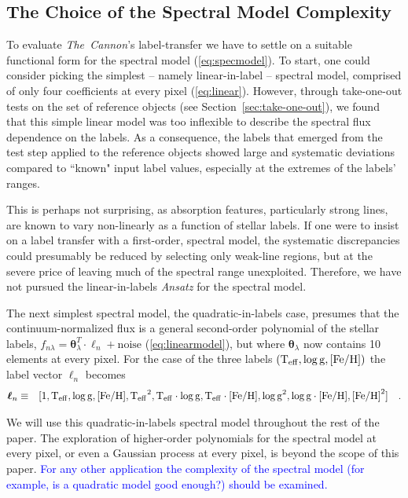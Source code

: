 \documentclass[12pt, preprint]{aastex}
\newcommand{\sectionname}{Section}
\newcommand{\tc}{\textsl{The~Cannon}}
\newcommand{\set}[1]{\bm{#1}}
\newcommand{\starlabel}{\ell}
\newcommand{\starlabelvec}{\set{\starlabel}}
\newcommand{\teff}{\mbox{$\rm T_{eff}$}}
\newcommand{\feh}{\mbox{$\rm [Fe/H]$}}
\newcommand{\logg}{\mbox{$\rm \log g$}}
\begin{document}
\subsection{The Choice of the Spectral Model Complexity}
\label{sec:ModelComplexity} 

To evaluate \tc 's label-transfer we have to settle on a suitable functional form for the spectral model (\ref{eq:specmodel}).
To start, one could consider picking the simplest -- namely linear-in-label -- spectral model, comprised of only four coefficients at every pixel (\ref{eq:linear}).
However, through take-one-out tests on the set of reference objects (see \sectionname~\ref{sec:take-one-out}), we found that this simple linear model was too inflexible to describe the spectral flux dependence on the labels.
As a consequence, the labels that emerged from the test step applied to the reference objects showed large and systematic deviations compared to ``known" input label values,
especially at the extremes of the labels' ranges. 

This is perhaps not surprising, as absorption features, particularly strong lines, are known to vary non-linearly as a function of stellar labels. If one were to insist on a label transfer with a first-order, spectral model, the systematic discrepancies could presumably be reduced by selecting only weak-line regions, but at the severe price of leaving much of the spectral range unexploited. Therefore, we have not pursued the linear-in-labels \textit{Ansatz} for the spectral model.

The next simplest spectral model, the quadratic-in-labels case,
 presumes that the continuum-normalized flux is a general second-order polynomial of the stellar labels, $f_{n\lambda} =
\set{\theta}_\lambda^T \cdot \starlabelvec_n + \mbox{noise}$ 
(\ref{eq:linearmodel}), 
but where $\set{\theta}_\lambda$ now contains 10 elements at every pixel.
For the case of the three labels $(\teff , \logg , \feh)$ the label vector $\starlabelvec_n$
becomes  
\begin{eqnarray}
\starlabelvec_n &\equiv&
[1, \teff, \logg, \feh, \teff^2, \teff\cdot\logg, \teff\cdot\feh, \logg^2, \logg\cdot\feh, \feh^2]
 \label{eq:quadinthreelabels}\quad.
\end{eqnarray}


We will use this quadratic-in-labels spectral model throughout the rest of the paper.  The exploration of higher-order polynomials for the spectral model at every pixel, or even a Gaussian process at every pixel, is beyond the scope of this paper. 
\textcolor{blue}{For any other application the complexity of the spectral model (for example, is a quadratic model good enough?) should be examined.}
 
\end{document}
